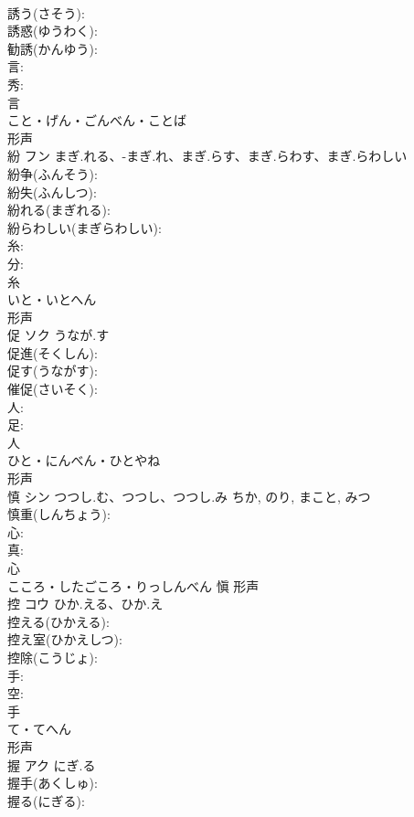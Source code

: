 \documentclass[8pt]{extreport}
\begin{document}
\begin{CJK}{UTF8}{min}
\\	誘う(さそう): 
\\	誘惑(ゆうわく): 
\\	勧誘(かんゆう): 
\\	言: 
\\	秀: 
\\	言	
\\	こと・げん・ごんべん・ことば	
\\	形声 
\\	紛	フン	まぎ.れる、-まぎ.れ、まぎ.らす、まぎ.らわす、まぎ.らわしい		
\\	紛争(ふんそう): 
\\	紛失(ふんしつ): 
\\	紛れる(まぎれる): 
\\	紛らわしい(まぎらわしい): 
\\	糸: 
\\	分: 
\\	糸	
\\	いと・いとへん	
\\	形声 
\\	促	ソク	うなが.す		
\\	促進(そくしん): 
\\	促す(うながす): 
\\	催促(さいそく): 
\\	人: 
\\	足: 
\\	人	
\\	ひと・にんべん・ひとやね	
\\	形声 
\\	慎	シン	つつし.む、つつし、つつし.み	ちか, のり, まこと, みつ	
\\	慎重(しんちょう): 
\\	心: 
\\	真: 
\\	心	
\\	こころ・したごころ・りっしんべん	愼	形声 
\\	控	コウ	ひか.える、ひか.え		
\\	控える(ひかえる): 
\\	控え室(ひかえしつ): 
\\	控除(こうじょ): 
\\	手: 
\\	空: 
\\	手	
\\	て・てへん	
\\	形声 
\\	握	アク	にぎ.る		
\\	握手(あくしゅ): 
\\	握る(にぎる): 

\end{CJK}
\end{document}
